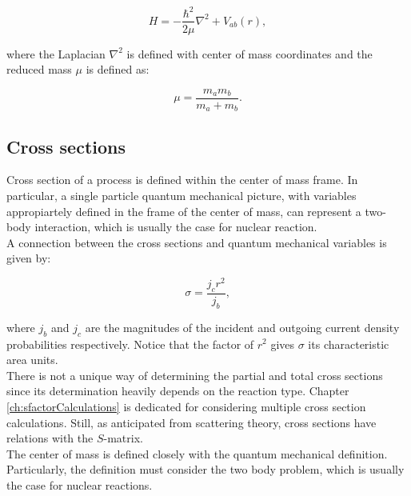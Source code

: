 \documentclass[openany]{book}
\begin{document}
\begin{equation}\label{eq:nuclearReaction_hamiltonian_centerMass}
	H = - \frac{\hbar^2}{2\mu} \nabla^2  + V_{ab}(r),
\end{equation}

where the Laplacian $ \nabla^2$ is defined with center of mass coordinates and the reduced mass $\mu$ is defined as: 

\begin{equation}\label{eq:nuclearReaction_reducedMass}
	\mu = \frac{m_a m_b}{m_a + m_b}.
\end{equation}

\subsection{Cross sections} \label{sub:crossSections}

Cross section of a process is defined within the center of mass frame. In particular, a single particle quantum mechanical picture, with variables appropiartely defined in the frame of the center of mass, can represent a two-body interaction, which is usually the case for nuclear reaction. \\

A connection between the cross sections and quantum mechanical variables is given by: 

\begin{equation}\label{eq:nuclearReaction_crossSection_quantumMechanics}
	\sigma = \frac{j_c r^2 }{j_b},
\end{equation}

where $j_b$ and $j_c$ are the magnitudes of the incident and outgoing current density probabilities respectively. Notice that the factor of $r^2$ gives $\sigma$ its characteristic area units. \\

There is not a unique way of determining the partial and total cross sections since its determination heavily depends  on the reaction type. Chapter \ref{ch:sfactorCalculations} is dedicated for considering multiple cross section calculations. Still, as anticipated from scattering theory, cross sections have relations with the $S$-matrix. \\

The center of mass is defined closely with the quantum mechanical definition. Particularly, the definition must consider the two body problem, which is usually the case for nuclear reactions. \\
\end{document}
